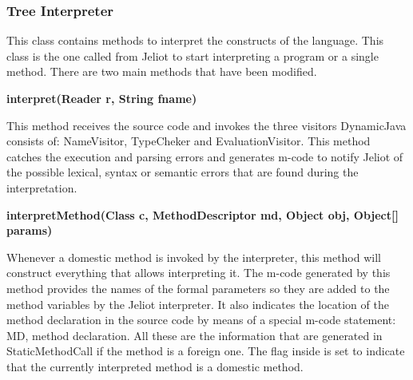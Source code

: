 \subsubsection{Tree Interpreter}

This class contains methods to interpret the constructs of the language. This class is the one called from Jeliot to start interpreting a program or a single method. There are two main methods that have been modified.

{\bf{interpret(Reader r, String fname)}}

This method receives the source code and invokes the three visitors DynamicJava consists of: NameVisitor, TypeCheker and EvaluationVisitor. This method catches the execution and parsing errors and generates m-code to notify Jeliot of the possible lexical, syntax or semantic errors that are found during the interpretation.

{\bf{interpretMethod(Class c, MethodDescriptor md, Object obj, Object[] params)}}

Whenever a domestic method is invoked by the interpreter, this method will construct everything that allows interpreting it. The m-code generated by this method provides the names of the formal parameters so they are added to the method variables by the Jeliot interpreter. It also indicates the location of the method declaration in the source code by means of a special m-code statement: MD, method declaration. All these are the information that are generated in StaticMethodCall if the method is a foreign one. The flag inside is set to indicate that the currently interpreted method is a domestic method.
